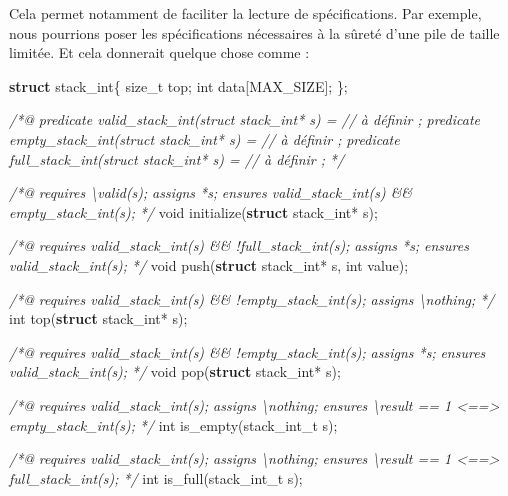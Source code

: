 \documentclass[12pt,francais,]{scrbook}
\newenvironment{Shaded}{}{}
\newcommand{\KeywordTok}[1]{\textcolor[rgb]{0.00,0.44,0.13}{\textbf{{#1}}}}
\newcommand{\DataTypeTok}[1]{\textcolor[rgb]{0.56,0.13,0.00}{{#1}}}
\newcommand{\CommentTok}[1]{\textcolor[rgb]{0.38,0.63,0.69}{\textit{{#1}}}}
\newcommand{\NormalTok}[1]{{#1}}
\begin{document}
Cela permet notamment de faciliter la lecture de spécifications. Par
exemple, nous pourrions poser les spécifications nécessaires à la sûreté
d'une pile de taille limitée. Et cela donnerait quelque chose comme :

\begin{footnotesize}\begin{Shaded}
\begin{Highlighting}[]
\KeywordTok{struct} \NormalTok{stack_int\{}
  \NormalTok{size_t top;}
  \DataTypeTok{int}    \NormalTok{data[MAX_SIZE];}
\NormalTok{\};}

\CommentTok{/*@}
\CommentTok{  predicate valid_stack_int(struct stack_int* s) = // à définir ;}
\CommentTok{  predicate empty_stack_int(struct stack_int* s) = // à définir ;}
\CommentTok{  predicate full_stack_int(struct stack_int* s) =  // à définir ;}
\CommentTok{*/}

\CommentTok{/*@}
\CommentTok{  requires \textbackslash{}valid(s);}
\CommentTok{  assigns *s;}
\CommentTok{  ensures valid_stack_int(s) && empty_stack_int(s);}
\CommentTok{*/}
\DataTypeTok{void} \NormalTok{initialize(}\KeywordTok{struct} \NormalTok{stack_int* s);}

\CommentTok{/*@}
\CommentTok{  requires valid_stack_int(s) && !full_stack_int(s);}
\CommentTok{  assigns  *s;}
\CommentTok{  ensures valid_stack_int(s);}
\CommentTok{*/}
\DataTypeTok{void} \NormalTok{push(}\KeywordTok{struct} \NormalTok{stack_int* s, }\DataTypeTok{int} \NormalTok{value);}

\CommentTok{/*@}
\CommentTok{  requires valid_stack_int(s) && !empty_stack_int(s);}
\CommentTok{  assigns \textbackslash{}nothing;}
\CommentTok{*/}
\DataTypeTok{int}  \NormalTok{top(}\KeywordTok{struct} \NormalTok{stack_int* s);}

\CommentTok{/*@}
\CommentTok{  requires valid_stack_int(s) && !empty_stack_int(s);}
\CommentTok{  assigns *s;}
\CommentTok{  ensures valid_stack_int(s);}
\CommentTok{*/}
\DataTypeTok{void} \NormalTok{pop(}\KeywordTok{struct} \NormalTok{stack_int* s);}

\CommentTok{/*@}
\CommentTok{  requires valid_stack_int(s);}
\CommentTok{  assigns \textbackslash{}nothing;}
\CommentTok{  ensures \textbackslash{}result == 1 <==> empty_stack_int(s);}
\CommentTok{*/}
\DataTypeTok{int}  \NormalTok{is_empty(stack_int_t s);}


\CommentTok{/*@}
\CommentTok{  requires valid_stack_int(s);}
\CommentTok{  assigns \textbackslash{}nothing;}
\CommentTok{  ensures \textbackslash{}result == 1 <==> full_stack_int(s);}
\CommentTok{*/}
\DataTypeTok{int}  \NormalTok{is_full(stack_int_t s);}
\end{Highlighting}
\end{Shaded}\end{footnotesize}
\end{document}
